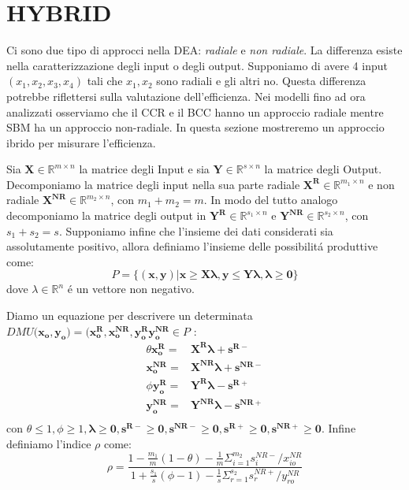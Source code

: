 \section{HYBRID}
\bigskip
Ci sono due tipo di approcci nella DEA: \emph{radiale} e \emph{non radiale}. La differenza esiste nella caratterizzazione degli input o degli output. Supponiamo di avere 4 input $(x_{1},x_{2},x_{3},x_{4})$ tali che $x_{1}, x_{2}$ sono radiali e gli altri no. Questa differenza potrebbe riflettersi sulla valutazione dell'efficienza. Nei modelli fino ad ora analizzati osserviamo che il CCR e il BCC hanno un approccio radiale mentre SBM ha un approccio non-radiale. In questa sezione mostreremo un approccio ibrido per misurare l'efficienza.
\begin{definiz} Sia $\boldsymbol{X} \in \mathbb{R}^{m \times n}$ la matrice degli Input e sia $\boldsymbol{Y} \in \mathbb{R}^{s \times n}$  la matrice degli Output. Decomponiamo la matrice degli input nella sua parte radiale $\boldsymbol{X^R} \in \mathbb{R}^{m_{1} \times n}$ e non radiale $\boldsymbol{X^{NR}} \in \mathbb{R}^{m_{2} \times n}$, con $m_{1} + m_{2} = m$. In modo del tutto analogo decomponiamo la matrice degli output in $\boldsymbol{Y^R} \in \mathbb{R}^{s_{1} \times n}$ e $\boldsymbol{Y^{NR}} \in \mathbb{R}^{s_{2} \times n}$, con $s_{1} + s_{2} = s$. Supponiamo infine che l'insieme dei dati considerati sia assolutamente positivo, allora definiamo l'insieme delle possibilit\'a produttive come:
\begin{equation}
P = \lbrace (\boldsymbol{x,y}) | \boldsymbol{x \geq X\lambda, y \leq Y\lambda , \lambda \geq 0 }\rbrace
\end{equation}
dove $\lambda \in \mathbb{R}^n$ \'e un vettore non negativo.
\end{definiz}
\begin{oss}
Diamo un equazione per descrivere un determinata $DMU(\boldsymbol{x_{o}, y_{o}) = (x_{o}^R, x_{o}^{NR}, y_{o}^R y_{o}^{NR}} \in P$ :
\begin{equation} \label{EQ:hybrid}
\begin{split}
\theta\boldsymbol{x_{o}^R} = & \boldsymbol{X^R\lambda + s^{R-}}\\
\boldsymbol{x_{o}^{NR}} = & \boldsymbol{X^{NR}\lambda + s^{NR-}}\\
\phi\boldsymbol{y_{o}^R} = & \boldsymbol{Y^R\lambda - s^{R+}}\\
\boldsymbol{y_{o}^{NR}} = & \boldsymbol{Y^{NR}\lambda - s^{NR+}}\\
\end{split}
\end{equation}
con $\theta \leq 1, \phi \geq 1, \boldsymbol{\lambda \geq 0, s^{R-} \geq 0, s^{NR-} \geq 0, s^{R+} \geq 0, s^{NR+} \geq 0}$.
Infine definiamo l'indice $\rho$ come:
\begin{equation}
\rho = \frac{1 - \frac{m_{1}}{m}(1 - \theta) - \frac{1}{m}\Sigma^{m_{2}}_{i=1} s^{NR-}_{i} / x_{io}^{NR}}{1 + \frac{s_{1}}{s}(\phi - 1) - \frac{1}{s}\Sigma^{s_{2}}_{r=1} s^{NR+}_{r} / y_{ro}^{NR}}
\end{equation}
\end{oss}

